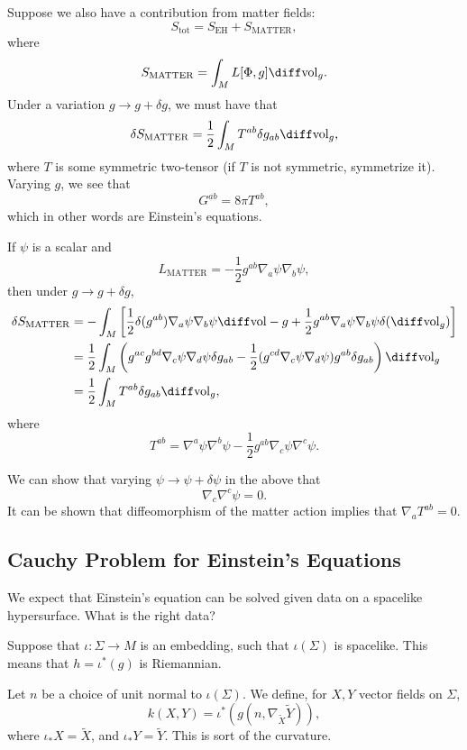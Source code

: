 \documentclass[12pt]{article}
\begin{document}
Suppose we also have a contribution from matter fields:
\[
S_{\mathrm{tot}} = S_{\mathrm{EH}} + S_{\mathrm{MATTER}},
\]
where
\[
	S_{\mathrm{MATTER}} = \int_M L[\Phi, g] \diff \mathrm{vol}_g.
\]
Under a variation $g \to g + \delta g$, we must have that
\[
\delta S_{\mathrm{MATTER}} = \frac 12 \int_M T^{ab} \delta g_{ab} \diff \mathrm{vol}_g,
\]
where $T$ is some symmetric two-tensor (if $T$ is not symmetric, symmetrize it). Varying $g$, we see that
\[
G^{ab} = 8 \pi T^{ab},
\]
which in other words are Einstein's equations.

\begin{exbox}
	If $\psi$ is a scalar and
	\[
	L_{\mathrm{MATTER}} = - \frac 12 g^{ab} \nabla_a \psi \nabla_b \psi,
	\]
	then under $g \to g + \delta g$,
	\begin{align*}
		\delta S_{\mathrm{MATTER}} &= - \int_M \left[ \frac 12 \delta(g^{ab}) \nabla_a \psi \nabla_b \psi \diff \mathrm{vol}-g + \frac 12 g^{ab} \nabla_a \psi \nabla_b \psi \delta(\diff \mathrm{vol}_g) \right] \\
					   &= \frac 12 \int_M \left( g^{ac} g^{bd} \nabla_c \psi \nabla_d \psi \delta g_{ab} - \frac 12 (g^{cd} \nabla_c \psi \nabla_d \psi) g^{ab} \delta g_{ab} \right) \diff \mathrm{vol}_g \\
					   &= \frac 12 \int_M T^{ab} \delta g_{ab} \diff \mathrm{vol}_g,
	\end{align*}
	where
	\[
		T^{ab} = \nabla^a \psi \nabla^b \psi - \frac 12 g^{ab} \nabla_c \psi \nabla^c \psi.
	\]
\end{exbox}

We can show that varying $\psi \to \psi + \delta \psi$ in the above that
\[
\nabla_c \nabla^c \psi = 0.
\]
It can be shown that diffeomorphism of the matter action implies that $\nabla_a T^{ab} = 0$.

\subsection{Cauchy Problem for Einstein's Equations}%
\label{sub:cpe}

We expect that Einstein's equation can be solved given data on a spacelike hypersurface. What is the right data?

Suppose that $\iota : \Sigma \to M$ is an embedding, such that $\iota(\Sigma)$ is spacelike. This means that $h= \iota^{\ast}(g)$ is Riemannian.

Let $n$ be a choice of unit normal to $\iota(\Sigma)$. We define, for $X, Y$ vector fields on $\Sigma$,
\[
k(X, Y) = \iota^{\ast} (g(n, \nabla_{\tilde X}\tilde Y)),
\]
where $\iota_\ast X = \tilde X$, and $\iota_\ast Y = \tilde Y$. This is sort of the curvature.
\end{document}
